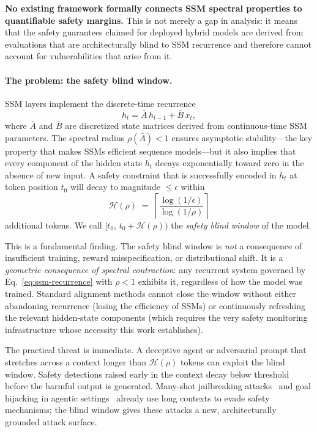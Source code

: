 \documentclass{article}
\newcommand{\Horizon}{\mathcal{H}(\rho)}
\begin{document}
\textbf{No existing framework formally connects SSM spectral properties to
quantifiable safety margins.}  This is not merely a gap in analysis: it means
that the safety guarantees claimed for deployed hybrid models are derived from
evaluations that are architecturally blind to SSM recurrence and therefore
cannot account for vulnerabilities that arise from it.

\paragraph{The problem: the safety blind window.}
SSM layers implement the discrete-time recurrence
\begin{equation}
  h_t = \bar{A}\, h_{t-1} + \bar{B}\, x_t,
  \label{eq:ssm-recurrence}
\end{equation}
where $\bar{A}$ and $\bar{B}$ are discretized state matrices derived from
continuous-time SSM parameters.  The spectral radius $\rho(\bar{A}) < 1$
ensures asymptotic stability---the key property that makes SSMs efficient
sequence models---but it also implies that every component of the hidden state
$h_t$ decays exponentially toward zero in the absence of new input.  A safety
constraint that is successfully encoded in $h_t$ at token position $t_0$ will
decay to magnitude $\leq \epsilon$ within
\begin{equation}
  \Horizon \;=\; \left\lceil \frac{\log(1/\epsilon)}{\log(1/\rho)} \right\rceil
  \label{eq:horizon}
\end{equation}
additional tokens.  We call $[t_0,\, t_0 + \Horizon)$ the \emph{safety blind
window} of the model.

This is a fundamental finding.  The safety blind window is \emph{not} a
consequence of insufficient training, reward misspecification, or distributional
shift.  It is a \emph{geometric consequence of spectral contraction}: any
recurrent system governed by Eq.~\eqref{eq:ssm-recurrence} with $\rho < 1$
exhibits it, regardless of how the model was trained.  Standard alignment
methods cannot close the window without either abandoning recurrence (losing the
efficiency of SSMs) or continuously refreshing the relevant hidden-state
components (which requires the very safety monitoring infrastructure whose
necessity this work establishes).

The practical threat is immediate.  A deceptive agent or adversarial prompt that
stretches across a context longer than $\Horizon$ tokens can exploit the blind
window.  Safety detections raised early in the context decay below threshold
before the harmful output is generated.  Many-shot jailbreaking
attacks~\cite{anil2024many} and goal hijacking in agentic
settings~\cite{perez2022ignore} already use long contexts to evade safety
mechanisms; the blind window gives these attacks a new, architecturally grounded
attack surface.
\end{document}
